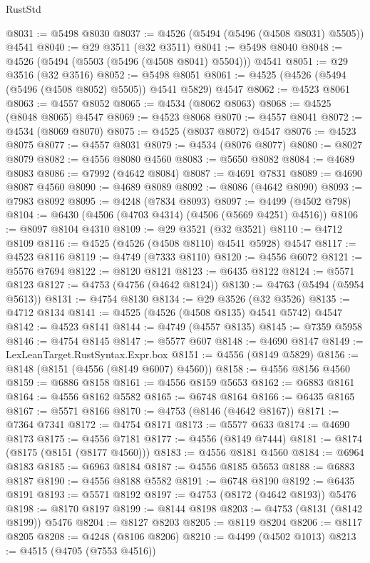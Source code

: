 \begin{lexlean}{RustStd}
\begin{coremodule}
{\begin{coremodule}
{{{{{{{{{{{{{{{{{{{{{{{{{{{{{{{{{{{{{{{{{{{{{{{{{{{{{{{@8031 := @5498 @8030
@8037 := @4526 (@5494 (@5496 (@4508 @8031) @5505)) @4541
@8040 := @29 @3511 (@32 @3511)
@8041 := @5498 @8040
@8048 := @4526 (@5494 (@5503 (@5496 (@4508 @8041) @5504))) @4541
@8051 := @29 @3516 (@32 @3516)
@8052 := @5498 @8051
@8061 := @4525 (@4526 (@5494 (@5496 (@4508 @8052) @5505)) @4541 @5829) @4547
@8062 := @4523 @8061
@8063 := @4557 @8052
@8065 := @4534 (@8062 @8063)
@8068 := @4525 (@8048 @8065) @4547
@8069 := @4523 @8068
@8070 := @4557 @8041
@8072 := @4534 (@8069 @8070)
@8075 := @4525 (@8037 @8072) @4547
@8076 := @4523 @8075
@8077 := @4557 @8031
@8079 := @4534 (@8076 @8077)
@8080 := @8027 @8079
@8082 := @4556 @8080 @4560
@8083 := @5650 @8082
@8084 := @4689 @8083
@8086 := @7992 (@4642 @8084)
@8087 := @4691 @7831
@8089 := @4690 @8087 @4560
@8090 := @4689 @8089
@8092 := @8086 (@4642 @8090)
@8093 := @7983 @8092
@8095 := @4248 (@7834 @8093)
@8097 := @4499 (@4502 @798)
@8104 := @6430 (@4506 (@4703 @4314) (@4506 (@5669 @4251) @4516))
@8106 := @8097 @8104 @4310
@8109 := @29 @3521 (@32 @3521)
@8110 := @4712 @8109
@8116 := @4525 (@4526 (@4508 @8110) @4541 @5928) @4547
@8117 := @4523 @8116
@8119 := @4749 (@7333 @8110)
@8120 := @4556 @6072
@8121 := @5576 @7694
@8122 := @8120 @8121
@8123 := @6435 @8122
@8124 := @5571 @8123
@8127 := @4753 (@4756 (@4642 @8124))
@8130 := @4763 (@5494 (@5954 @5613))
@8131 := @4754 @8130
@8134 := @29 @3526 (@32 @3526)
@8135 := @4712 @8134
@8141 := @4525 (@4526 (@4508 @8135) @4541 @5742) @4547
@8142 := @4523 @8141
@8144 := @4749 (@4557 @8135)
@8145 := @7359 @5958
@8146 := @4754 @8145
@8147 := @5577 @607
@8148 := @4690 @8147
@8149 := LexLeanTarget.RustSyntax.Expr.box
@8151 := @4556 (@8149 @5829)
@8156 := @8148 (@8151 (@4556 (@8149 @6007) @4560))
@8158 := @4556 @8156 @4560
@8159 := @6886 @8158
@8161 := @4556 @8159 @5653
@8162 := @6883 @8161
@8164 := @4556 @8162 @5582
@8165 := @6748 @8164
@8166 := @6435 @8165
@8167 := @5571 @8166
@8170 := @4753 (@8146 (@4642 @8167))
@8171 := @7364 @7341
@8172 := @4754 @8171
@8173 := @5577 @633
@8174 := @4690 @8173
@8175 := @4556 @7181
@8177 := @4556 (@8149 @7444)
@8181 := @8174 (@8175 (@8151 (@8177 @4560)))
@8183 := @4556 @8181 @4560
@8184 := @6964 @8183
@8185 := @6963 @8184
@8187 := @4556 @8185 @5653
@8188 := @6883 @8187
@8190 := @4556 @8188 @5582
@8191 := @6748 @8190
@8192 := @6435 @8191
@8193 := @5571 @8192
@8197 := @4753 (@8172 (@4642 @8193)) @5476
@8198 := @8170 @8197
@8199 := @8144 @8198
@8203 := @4753 (@8131 (@8142 @8199)) @5476
@8204 := @8127 @8203
@8205 := @8119 @8204
@8206 := @8117 @8205
@8208 := @4248 (@8106 @8206)
@8210 := @4499 (@4502 @1013)
@8213 := @4515 (@4705 (@7553 @4516))
}}}}}}}}}}}}}}}}}}}}}}}}}}}}}}}}}}}}}}}}}}}}}}}}}}}}}}}
\end{coremodule}}
\end{coremodule}
\end{lexlean}
